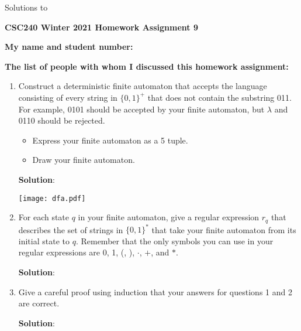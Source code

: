 \documentclass[11pt]{article}
\begin{document}
\begin{center}
Solutions to

{\bf \Large \bf CSC240 Winter 2021 Homework Assignment 9}\\
\end{center}


\noindent
{\bf My name and student number:}

\medskip

\noindent
{\bf The list of people with whom I discussed this homework assignment:}

\medskip

\begin{enumerate}
\item
\begin{question}
Construct a deterministic finite automaton that accepts the
language consisting of every string in $\{0,1\}^+$ that does not contain
the substring 011.
For example, 0101 should be accepted by your finite automaton, but $\lambda$ and 0110 should be rejected.

\begin{itemize}
\item
Express your finite automaton as a 5 tuple.
\item
Draw your finite automaton.
\end{itemize}
\end{question}

\begin{solution}
{\bf Solution}:\\

\begin{center}
\texttt{[image: dfa.pdf]}
\end{center}
\end{solution}

\item
\begin{question}
For each state $q$ in your finite automaton, give a regular expression $r_q$ that describes 
the set of strings in $\{0,1\}^*$ that take your finite automaton from its initial state to $q$.
Remember that the only symbols you can use in your regular expressions are 0, 1, (,  ), $\cdot$, $+$,  and $*$.
\end{question}

\begin{solution}
{\bf Solution}:\\
\end{solution}

\item
\begin{question}
Give a careful proof using induction that your answers for questions 1 and 2 are correct.	
\end{question}

\begin{solution}
{\bf Solution}:

\end{solution}
\end{enumerate}
\end{document}
